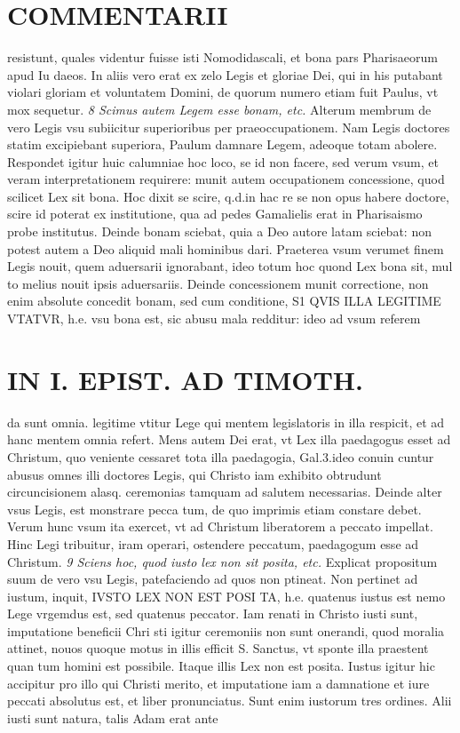 \documentclass{article}
\begin{document}
\begin{pages}
\section*{COMMENTARII }
\marginpar{[ p.26 ]}\pstart resistunt, quales videntur fuisse isti Nomodidascali, et bona pars Pharisaeorum apud Iu daeos. In aliis vero erat ex zelo Legis et gloriae Dei, qui in his putabant violari gloriam et voluntatem Domini, de quorum numero etiam fuit Paulus, vt mox sequetur.  \pend
\textit{8 Scimus autem Legem esse bonam, etc. }\pstart Alterum membrum de vero Legis vsu subiicitur superioribus per praeoccupationem. Nam Legis doctores statim excipiebant superiora, Paulum damnare Legem, adeoque totam abolere. Respondet igitur huic calumniae hoc loco, se id non facere, sed verum vsum, et veram interpretationem requirere: munit autem occupationem concessione, quod scilicet Lex sit bona. Hoc dixit se scire, q.d.in hac re se non opus habere doctore, scire id poterat ex institutione, qua ad pedes Gamalielis erat in Pharisaismo probe institutus. Deinde bonam sciebat, quia a Deo autore latam sciebat: non potest autem a Deo aliquid mali hominibus dari. Praeterea vsum verumet finem Legis nouit, quem aduersarii ignorabant, ideo totum hoc quond Lex bona sit, mul to melius nouit ipsis aduersariis. Deinde concessionem munit correctione, non enim absolute concedit bonam, sed cum conditione, S1 QVIS ILLA LEGITIME VTATVR, h.e. vsu bona est, sic abusu mala redditur: ideo ad vsum referem\pend
\section*{IN I. EPIST. AD TIMOTH. }
\marginpar{[ p.27 ]}\pstart da sunt omnia. legitime vtitur Lege qui mentem legislatoris in illa respicit, et ad hanc mentem omnia refert. Mens autem Dei erat, vt Lex illa paedagogus esset ad Christum, quo veniente cessaret tota illa paedagogia, Gal.3.ideo conuin cuntur abusus omnes illi doctores Legis, qui Christo iam exhibito obtrudunt circuncisionem alasq. ceremonias tamquam ad salutem necessarias. Deinde alter vsus Legis, est monstrare pecca tum, de quo imprimis etiam constare debet. Verum hunc vsum ita exercet, vt ad Christum liberatorem a peccato impellat. Hinc Legi tribuitur, iram operari, ostendere peccatum, paedagogum esse ad Christum.  \pend
\textit{9 Sciens hoc, quod iusto lex non sit posita, etc. }\pstart Explicat propositum suum de vero vsu Legis, patefaciendo ad quos non ptineat. Non pertinet ad iustum, inquit, IVSTO LEX NON EST POSI TA, h.e. quatenus iustus est nemo Lege vrgemdus est, sed quatenus peccator. Iam renati in Christo iusti sunt, imputatione beneficii Chri sti igitur ceremoniis non sunt onerandi, quod moralia attinet, nouos quoque motus in illis efficit S. Sanctus, vt sponte illa praestent quan tum homini est possibile. Itaque illis Lex non est posita. Iustus igitur hic accipitur pro illo qui Christi merito, et imputatione iam a damnatione et iure peccati absolutus est, et liber pronunciatus. Sunt enim iustorum tres ordines. Alii iusti sunt natura, talis Adam erat ante  \pend

\end{pages}
\end{document}
